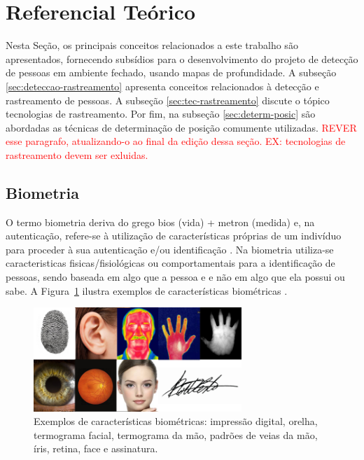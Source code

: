 \section{Referencial Teórico}\label{sec:referencial-teorico}

Nesta Seção, os principais conceitos relacionados a este trabalho são apresentados, fornecendo subsídios para o desenvolvimento do projeto de detecção de pessoas em ambiente fechado, usando mapas de profundidade. A subseção \ref{sec:deteccao-rastreamento} apresenta conceitos relacionados à detecção e rastreamento de pessoas. A subseção \ref{sec:tec-rastreamento} discute o tópico tecnologias de rastreamento. Por fim, na subseção \ref{sec:determ-posic} são abordadas as técnicas de determinação de posição comumente utilizadas. \textcolor{red}{REVER esse paragrafo, atualizando-o ao final da edição dessa seção. EX: tecnologias de rastreamento devem ser exluidas.}


\subsection{Biometria}\label{sec:biometria}
O termo biometria deriva do grego bios (vida) + metron (medida) e, na autenticação, refere-se à utilização de características próprias de um indivíduo para proceder à sua autenticação e/ou identificação \cite{magalhaes2003biometria}. Na biometria utiliza-se caracteristicas fisicas/fisiológicas ou comportamentais para a identificação de pessoas, sendo baseada em algo que a pessoa e e não em algo que ela possui ou sabe. A Figura~\ref{fig:biometria} ilustra exemplos de características biométricas \cite{cardia2015avaliaccao}.

\begin{figure}[ht]
\centering
    \includegraphics[resolution=300,width=0.7\textwidth,natwidth=610,natheight=642]{images/biometria.png}
    \caption{Exemplos de características biométricas: impressão digital, orelha, termograma facial, termograma da mão, padrões de veias da mão, íris, retina, face e assinatura.}
    \label{fig:biometria}
\end{figure}

